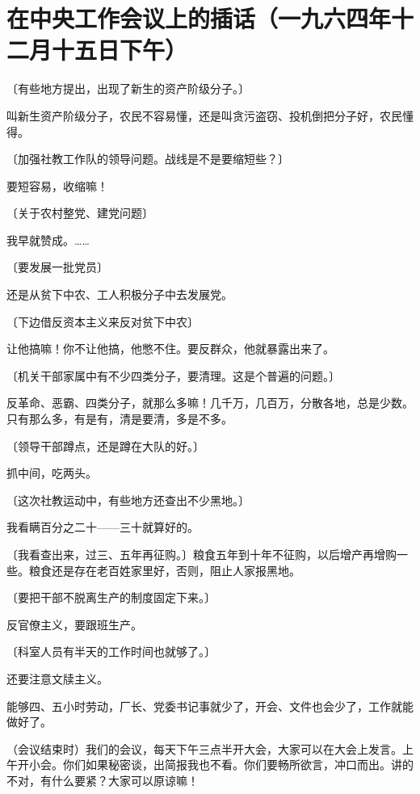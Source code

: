 \section[在中央工作会议上的插话（一九六四年十二月十五日下午）]{在中央工作会议上的插话（一九六四年十二月十五日下午）}


〔有些地方提出，出现了新生的资产阶级分子。〕

叫新生资产阶级分子，农民不容易懂，还是叫贪污盗窃、投机倒把分子好，农民懂得。

〔加强社教工作队的领导问题。战线是不是要缩短些？〕

要短容易，收缩嘛！

〔关于农村整党、建党问题〕

我早就赞成。……

〔要发展一批党员〕

还是从贫下中农、工人积极分子中去发展党。

〔下边借反资本主义来反对贫下中农〕

让他搞嘛！你不让他搞，他憋不住。要反群众，他就暴露出来了。

〔机关干部家属中有不少四类分子，要清理。这是个普遍的问题。〕

反革命、恶霸、四类分子，就那么多嘛！几千万，几百万，分散各地，总是少数。只有那么多，有是有，清是要清，多是不多。

〔领导干部蹲点，还是蹲在大队的好。〕

抓中间，吃两头。

〔这次社教运动中，有些地方还查出不少黑地。〕

我看瞒百分之二十——三十就算好的。

〔我看查出来，过三、五年再征购。〕粮食五年到十年不征购，以后增产再增购一些。粮食还是存在老百姓家里好，否则，阻止人家报黑地。

〔要把干部不脱离生产的制度固定下来。〕

反官僚主义，要跟班生产。

〔科室人员有半天的工作时间也就够了。〕

还要注意文牍主义。

能够四、五小时劳动，厂长、党委书记事就少了，开会、文件也会少了，工作就能做好了。

（会议结束时）我们的会议，每天下午三点半开大会，大家可以在大会上发言。上午开小会。你们如果秘密谈，出简报我也不看。你们要畅所欲言，冲口而出。讲的不对，有什么要紧？大家可以原谅嘛！


